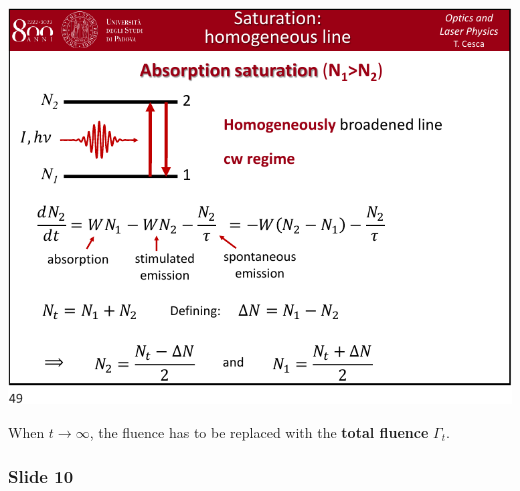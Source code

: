 \documentclass[../main/main.tex]{subfiles}
\begin{document}
\begin{minipage}[]{0.5\linewidth}
\centering
\includegraphics[page=9,width=1\textwidth]{../lessons/pdf_file/10_lecture.pdf}
\end{minipage}
\hspace{0.3cm}\vspace{0.3cm}
\begin{minipage}[c]{0.47\linewidth}

When \( t \rightarrow \infty  \), the fluence has to be replaced with the \textbf{total fluence} \( \Gamma _t \).

\end{minipage}

\subsubsection*{Slide 10}
\end{document}

